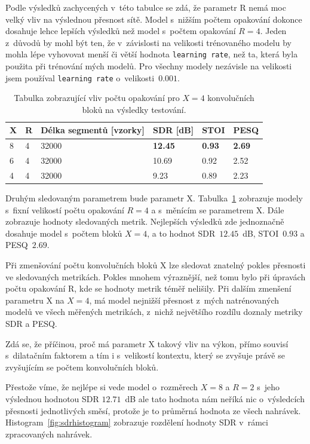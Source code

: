 Podle výsledků zachycených v~této tabulce se zdá, že parametr R nemá moc velký vliv na výslednou přesnost sítě. Model s~nižším počtem opakování dokonce dosahuje lehce lepších výsledků než model s~počtem opakování $R = 4$. Jeden z~důvodů by mohl být ten, že v~závislosti na velikosti trénovaného modelu by mohla lépe vyhovovat menší či větší hodnota \texttt{learning~rate}, než ta, která byla použita při trénování mých modelů. Pro všechny modely nezávisle na velikosti jsem používal \texttt{learning rate} o~velikosti~$0.001$.


\begin{table}[!htbp]
\centering
\caption{Tabulka zobrazující vliv počtu opakování pro $X=4$ konvolučních bloků na výsledky testování.}
\label{tab:vliv-X}
\begin{tabular}{|l|l|l|l|l|l|}
\hline
\textbf{X} & \textbf{R} & \textbf{Délka segmentů {[}vzorky{]}} & \textbf{SDR {[}dB{]}} & \textbf{STOI} & \textbf{PESQ} \\ \hline
8 & 4 & 32000 & \textbf{12.45} & \textbf{0.93} & \textbf{2.69} \\ \hline
6 & 4 & 32000 & 10.69 & 0.92 & 2.52 \\ \hline
4 & 4 & 32000 & 9.23 & 0.89 & 2.23 \\ \hline
\end{tabular}
\end{table}

Druhým sledovaným parametrem bude parametr X. Tabulka~\ref{tab:vliv-X} zobrazuje modely s~fixní velikostí počtu opakování $R=4$ a s~měnícím se parametrem X. Dále zobrazuje hodnoty sledovaných metrik. Nejlepších výsledků zde jednoznačně dosahuje model s~počtem bloků $X = 4$, a to hodnot SDR~$12.45$~dB, STOI~$0.93$ a PESQ~$2.69$. 

Při zmenšování počtu konvolučních bloků X lze sledovat znatelný pokles přesnosti ve sledovaných metrikách. Pokles mnohem výraznější, než tomu bylo při úpravách počtu opakování R, kde se hodnoty metrik téměř nelišily. Při dalším zmenšení parametru X na $X=4$, má model nejnižší přesnost z~mých natrénovaných modelů ve všech měřených metrikách, z~nichž největšího rozdílu doznaly metriky SDR a PESQ. 

Zdá se, že příčinou, proč má parametr X takový vliv na výkon, přímo souvisí s~dilatačním faktorem a tím i s~velikostí kontextu, který se zvyšuje právě se zvyšujícím se počtem konvolučních bloků.

Přestože víme, že nejlépe si vede model o~rozměrech $X=8$ a $R=2$ s~jeho výslednou hodnotou SDR $12.71$~dB ale tato hodnota nám neříká nic o~výsledcích přesnosti jednotlivých směsí, protože je to průměrná hodnota ze všech nahrávek. Histogram~\ref{fig:sdrhistogram} zobrazuje rozdělení hodnoty SDR v~rámci zpracovaných nahrávek.

